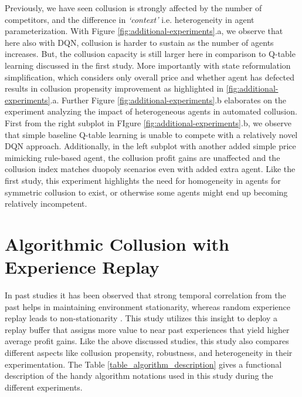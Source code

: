 \documentclass{article}
\begin{document}
Previously, we have seen collusion is strongly affected by the number of competitors, and the difference in \textit{`context’} i.e. heterogeneity in agent parameterization.
With Figure \ref{fig:additional-experiments}.a, we observe that here also with DQN, collusion is harder to sustain as the number of agents increases.
But, the collusion capacity is still larger here in comparison to Q-table learning discussed in the first study.
More importantly with state reformulation simplification, which considers only overall price and whether agent has defected results in collusion propensity improvement as highlighted in \ref{fig:additional-experiments}.a.
Further Figure \ref{fig:additional-experiments}.b elaborates on the experiment analyzing the impact of heterogeneous agents in automated collusion.
First from the right subplot in FIgure \ref{fig:additional-experiments}.b, we observe that simple baseline Q-table learning is unable to compete with a relatively novel DQN approach.
Additionally, in the left subplot with another added simple price mimicking rule-based agent, the collusion profit gains are unaffected and the collusion index matches duopoly scenarios even with added extra agent.
Like the first study, this experiment highlights the need for homogeneity in agents for symmetric collusion to exist, or otherwise some agents might end up becoming relatively incompetent.


\section{Algorithmic Collusion with Experience Replay}



In past studies it has been observed that strong temporal correlation from the past helps in maintaining environment stationarity, whereas random experience replay leads to non-stationarity \cite{leibo2017multi, foerster2017stabilising}.
This study utilizes this insight to deploy a replay buffer that assigns more value to near past experiences that yield higher average profit gains.
Like the above discussed studies, this study also compares different aspects like collusion propensity, robustness, and heterogeneity in their experimentation.
The Table \ref{table_algorithm_description} gives a functional description of the handy algorithm notations used in this study during the different experiments.
\end{document}
